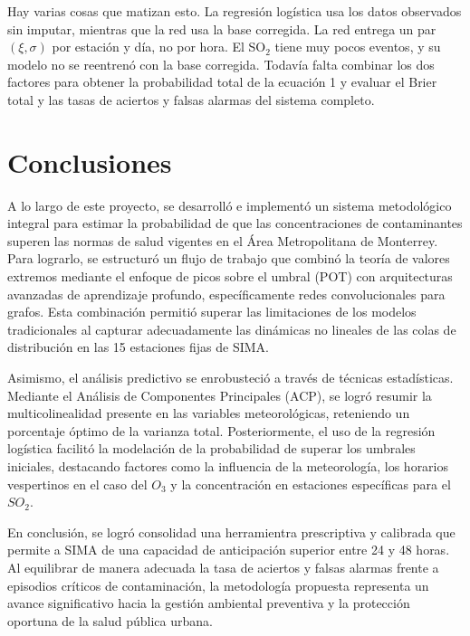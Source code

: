 \documentclass[11pt]{article}
\begin{document}
Hay varias cosas que matizan esto. La regresión logística usa los datos observados sin imputar, mientras que la red usa la base corregida. La red entrega un par $(\xi, \sigma)$ por estación y día, no por hora. El SO$_2$ tiene muy pocos eventos, y su modelo no se reentrenó con la base corregida. Todavía falta combinar los dos factores para obtener la probabilidad total de la ecuación 1 y evaluar el Brier total y las tasas de aciertos y falsas alarmas del sistema completo.



\section{Conclusiones} %

A lo largo de este proyecto, se desarrolló e implementó un sistema metodológico integral para estimar la probabilidad de que las concentraciones de contaminantes superen las normas de salud vigentes en el Área Metropolitana de Monterrey. Para lograrlo, se estructuró un flujo de trabajo que combinó la teoría de valores extremos mediante el enfoque de picos sobre el umbral (POT) con arquitecturas avanzadas de aprendizaje profundo, específicamente redes convolucionales para grafos. Esta combinación permitió superar las limitaciones de los modelos tradicionales al capturar adecuadamente las dinámicas no lineales de las colas de distribución en las 15 estaciones fijas de SIMA. 

Asimismo, el análisis predictivo se enrobusteció a través de técnicas estadísticas. Mediante el Análisis de Componentes Principales (ACP), se logró resumir la multicolinealidad presente en las variables meteorológicas, reteniendo un porcentaje óptimo de la varianza total. Posteriormente, el uso de la regresión logística facilitó la modelación de la probabilidad de superar los umbrales iniciales, destacando factores como la influencia de la meteorología, los horarios vespertinos en el caso del $O_3$ y la concentración en estaciones específicas para el $SO_2$.

En conclusión, se logró consolidad una herramientra prescriptiva y calibrada que permite a SIMA de una capacidad de anticipación superior entre 24 y 48 horas. Al equilibrar de manera adecuada la tasa de aciertos y falsas alarmas frente a episodios críticos de contaminación, la metodología propuesta representa un avance significativo hacia la gestión ambiental preventiva y la protección oportuna de la salud pública urbana.

\appendix

\pagebreak

\nocite{*}


\end{document}

